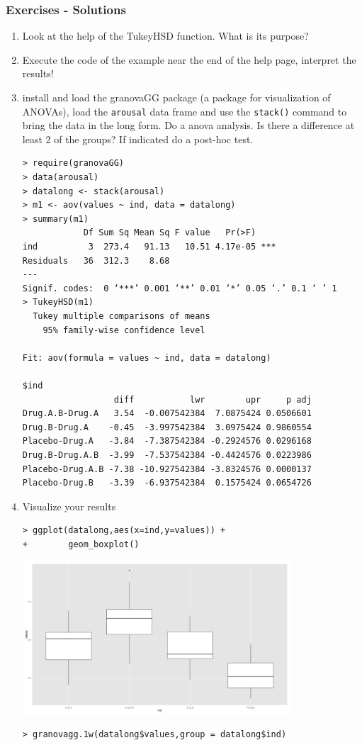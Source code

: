 \begin{frame}\frametitle{Exercises - Solutions}
  \begin{enumerate}
  \item Look at the help of the TukeyHSD function. What is its purpose? 
  \item Execute the code of the example near the end of the help page, interpret the results!
  \item install and load the granovaGG package (a package for visualization of ANOVAs), load the \texttt{arousal} data frame and use the \texttt{stack()} command to bring the data in the long form. Do a anova analysis. Is there a difference at least 2 of the groups? If indicated do a post-hoc test.\scriptsize
\begin{verbatim}
> require(granovaGG)
> data(arousal)
> datalong <- stack(arousal)
> m1 <- aov(values ~ ind, data = datalong)
> summary(m1)
            Df Sum Sq Mean Sq F value   Pr(>F)    
ind          3  273.4   91.13   10.51 4.17e-05 ***
Residuals   36  312.3    8.68                     
---
Signif. codes:  0 ‘***’ 0.001 ‘**’ 0.01 ‘*’ 0.05 ‘.’ 0.1 ‘ ’ 1
> TukeyHSD(m1)
  Tukey multiple comparisons of means
    95% family-wise confidence level

Fit: aov(formula = values ~ ind, data = datalong)

$ind
                  diff           lwr        upr     p adj
Drug.A.B-Drug.A   3.54  -0.007542384  7.0875424 0.0506601
Drug.B-Drug.A    -0.45  -3.997542384  3.0975424 0.9860554
Placebo-Drug.A   -3.84  -7.387542384 -0.2924576 0.0296168
Drug.B-Drug.A.B  -3.99  -7.537542384 -0.4424576 0.0223986
Placebo-Drug.A.B -7.38 -10.927542384 -3.8324576 0.0000137
Placebo-Drug.B   -3.39  -6.937542384  0.1575424 0.0654726
\end{verbatim}\normalsize
  \item Visualize your results\scriptsize
\begin{verbatim}
> ggplot(datalong,aes(x=ind,y=values)) + 
+        geom_boxplot()  
\end{verbatim}
\begin{center}
\includegraphics[width=10cm]{img/aovgr1.png}
\end{center}
\begin{verbatim}
> granovagg.1w(datalong$values,group = datalong$ind)


\end{verbatim}
\end{enumerate}
\end{frame}
